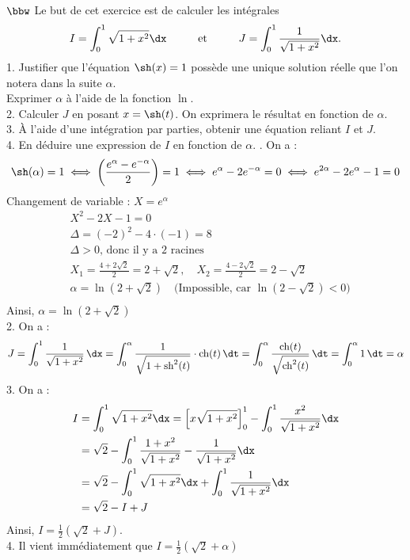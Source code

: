 \documentclass[11pt]{article}
\begin{document}
\begin{exercice}{$\bbw$}{}
    Le but de cet exercice est de calculer les intégrales
    \begin{equation*}
        I = \int_0^1{\sqrt{1+x^2}\dx} \hspace{1cm} \text{et} \hspace{1cm} J=\int_0^1{\frac{1}{\sqrt{1+x^2}}\dx}.
    \end{equation*}
    1. Justifier que l'équation $\sh(x)=1$ possède une unique solution réelle que l'on notera dans la suite $\alpha$.\\
    Exprimer $\alpha$ à l'aide de la fonction $\ln$.\\
    2. Calculer $J$ en posant $x=\sh(t)$. On exprimera le résultat en fonction de $\alpha$.\\
    3. À l'aide d'une intégration par parties, obtenir une équation reliant $I$ et $J$.\\
    4. En déduire une expression de $I$ en fonction de $\alpha$.
    . On a :
    \begin{equation*}
        \sh(\alpha) = 1 \iff \left( \frac{e^\alpha - e^{-\alpha}}{2} \right) = 1 \iff e^\alpha - 2e^{-\alpha} = 0 \iff e^{2\alpha} - 2e^\alpha - 1 = 0
    \end{equation*}
    Changement de variable : $X = e^\alpha$
    \begin{align*}
        &X^2 - 2X - 1 = 0 \\
        &\Delta = (-2)^2 - 4 \cdot (-1) = 8 \\
        &\Delta > 0 \text{, donc il y a 2 racines} \\
        &X_1 = \frac{4 + 2\sqrt{2}}{2} = 2 + \sqrt{2}, \quad X_2 = \frac{4 - 2\sqrt{2}}{2} = 2-\sqrt{2} \\
        &\alpha = \ln(2 + \sqrt{2}) \quad \text{(Impossible, car } \ln(2 - \sqrt{2}) < 0) \\
    \end{align*}
    Ainsi, $\alpha=\ln(2+\sqrt{2})$\\
    2. On a :
    \begin{equation*}
        J = \int_0^1 \frac{1}{\sqrt{1+x^2}} \, \dx = \int_0^\alpha \frac{1}{\sqrt{1+\text{sh}^2(t)}} \cdot \text{ch}(t) \, \dt = \int_0^\alpha \frac{\text{ch}(t)}{\sqrt{\text{ch}^2(t)}} \, \dt = \int_0^\alpha 1 \, \dt = \alpha
    \end{equation*}
    3. On a :
    \begin{align*}
        I &= \int_0^1{\sqrt{1+x^2}\dx}=\left[x\sqrt{1+x^2}\right]_0^1 - \int_0^1{\frac{x^2}{\sqrt{1+x^2}}\dx}\\
        &= \sqrt{2} - \int_0^1{\frac{1+x^2}{\sqrt{1+x^2}}-\frac{1}{\sqrt{1+x^2}}\dx}\\
        &=\sqrt{2} - \int_0^1{\sqrt{1+x^2}\dx} + \int_0^1{\frac{1}{\sqrt{1+x^2}}\dx}\\
        &=\sqrt{2} - I + J
    \end{align*}
    Ainsi, $I = \frac{1}{2}\left(\sqrt{2} + J\right)$.\\
    4. Il vient immédiatement que $I=\frac{1}{2}\left(\sqrt{2}+\alpha\right)$
\end{exercice}
\end{document}
